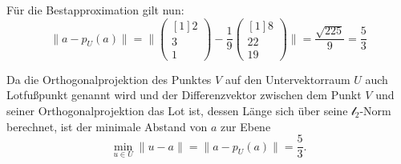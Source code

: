 \documentclass[main.tex]{subfiles}
\begin{document}
Für die Bestapproximation gilt nun:
\begin{equation*}
\| a-p_{U}( a) \| =\| \begin{pmatrix}[1]
2\\
3\\
1
\end{pmatrix} -\frac{1}{9}\begin{pmatrix}[1]
8\\
22\\
19
\end{pmatrix} \| =\frac{\sqrt{225}}{9} =\frac{5}{3}
\end{equation*}


Da die Orthogonalprojektion des Punktes $V$ auf den Untervektorraum $U$ auch Lotfußpunkt genannt wird und der Differenzvektor zwischen dem Punkt $V$ und seiner Orthogonalprojektion das Lot ist, dessen Länge sich über seine $\mathcal{l}_{2}$-Norm berechnet, ist der minimale Abstand von $a$ zur Ebene
\begin{equation*}
\underset{u\in U}{\min} \| u-a\| =\| a-p_{U}( a) \| =\frac{5}{3}\text{.}
\end{equation*}
\end{document}
